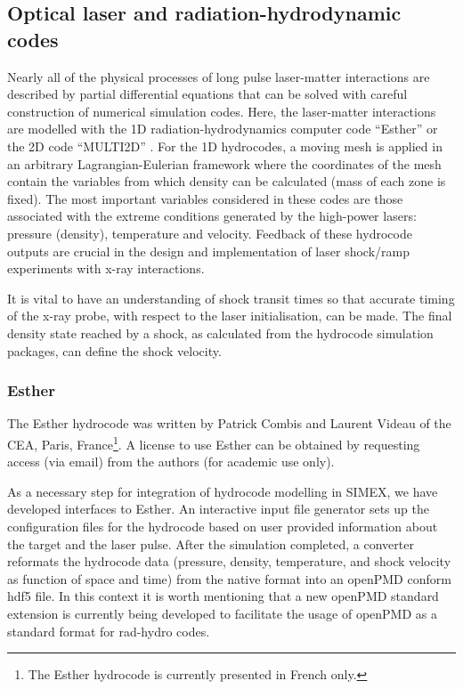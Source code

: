 \documentclass[10pt]{scrartcl}
\begin{document}
\subsection{Optical laser and radiation-hydrodynamic codes}
Nearly all of the physical processes of long pulse laser-matter interactions are described by partial differential
equations that can be solved with careful construction of numerical simulation codes. Here, the laser-matter
interactions are modelled with the 1D radiation-hydrodynamics computer code ``Esther'' \cite{Colombier2005}
or the 2D code ``MULTI2D'' \cite{Ramis2009}.
For the 1D hydrocodes, a moving mesh is applied in an arbitrary Lagrangian-Eulerian framework where the coordinates of
the mesh contain the variables from which density can be calculated (mass of
each zone is fixed). The most important variables
considered in these codes are those associated with the extreme conditions generated by the high-power lasers: pressure (density),
temperature and velocity. Feedback of these hydrocode outputs are crucial in the design and implementation of laser shock/ramp
experiments with x-ray interactions.

It is vital to have an understanding of shock transit times so that accurate timing of the x-ray probe,
with respect to the laser initialisation, can be made. The final density state reached by a shock, as calculated
from the hydrocode simulation packages, can define the shock velocity.

\subsubsection{Esther}
The Esther hydrocode was written by Patrick Combis and Laurent Videau of the
CEA, Paris, France\footnote{The Esther hydrocode is currently presented in
French only.}.
A license to use Esther can be obtained by requesting access (via email) from the authors (for academic use only).

As a necessary step for integration of hydrocode modelling in SIMEX, we have
developed interfaces to Esther. An interactive input file generator sets up
the configuration files for the hydrocode based on user provided information
about the target and the laser pulse. After the simulation completed, a
converter reformats the hydrocode data (pressure, density, temperature, and
shock velocity as function of space and time) from the native format into an
openPMD \cite{openPMD} conform hdf5 file. In this context it is worth mentioning that a new
openPMD standard extension is currently being developed to facilitate the
usage of openPMD as a standard format for rad-hydro codes.
\end{document}
